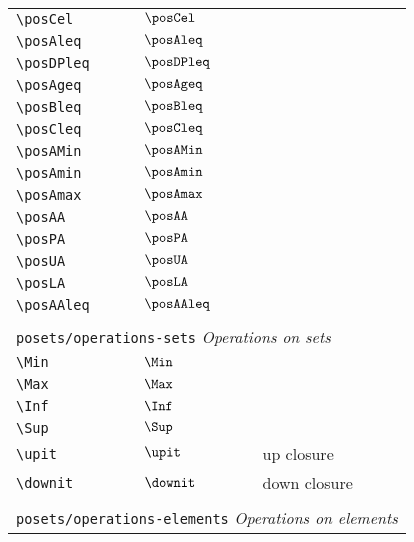 \begin{longtable}{lll}
 {\color[rgb]{0.5,0.5,0.5}\texttt{\textbackslash posCel}} & $\posCel$ & \\ 
 {\color[rgb]{0.5,0.5,0.5}\texttt{\textbackslash posAleq}} & $\posAleq$ & \\ 
 {\color[rgb]{0.5,0.5,0.5}\texttt{\textbackslash posDPleq}} & $\posDPleq$ & \\ 
 {\color[rgb]{0.5,0.5,0.5}\texttt{\textbackslash posAgeq}} & $\posAgeq$ & \\ 
 {\color[rgb]{0.5,0.5,0.5}\texttt{\textbackslash posBleq}} & $\posBleq$ & \\ 
 {\color[rgb]{0.5,0.5,0.5}\texttt{\textbackslash posCleq}} & $\posCleq$ & \\ 
 {\color[rgb]{0.5,0.5,0.5}\texttt{\textbackslash posAMin}} & $\posAMin$ & \\ 
 {\color[rgb]{0.5,0.5,0.5}\texttt{\textbackslash posAmin}} & $\posAmin$ & \\ 
 {\color[rgb]{0.5,0.5,0.5}\texttt{\textbackslash posAmax}} & $\posAmax$ & \\ 
 {\color[rgb]{0.5,0.5,0.5}\texttt{\textbackslash posAA}} & $\posAA$ & \\ 
 {\color[rgb]{0.5,0.5,0.5}\texttt{\textbackslash posPA}} & $\posPA$ & \\ 
 {\color[rgb]{0.5,0.5,0.5}\texttt{\textbackslash posUA}} & $\posUA$ & \\ 
 {\color[rgb]{0.5,0.5,0.5}\texttt{\textbackslash posLA}} & $\posLA$ & \\ 
 {\color[rgb]{0.5,0.5,0.5}\texttt{\textbackslash posAAleq}} & $\posAAleq$ & \\ 
  &  & \\ 
 \multicolumn{3}{l}{{\color[rgb]{0.5,0.5,0.5}\texttt{posets/operations-sets}} \emph{Operations on sets}}\\ 
 \hline
{\color[rgb]{0.5,0.5,0.5}\texttt{\textbackslash Min}} & $\Min$ & \\ 
 {\color[rgb]{0.5,0.5,0.5}\texttt{\textbackslash Max}} & $\Max$ & \\ 
 {\color[rgb]{0.5,0.5,0.5}\texttt{\textbackslash Inf}} & $\Inf$ & \\ 
 {\color[rgb]{0.5,0.5,0.5}\texttt{\textbackslash Sup}} & $\Sup$ & \\ 
 {\color[rgb]{0.5,0.5,0.5}\texttt{\textbackslash upit}} & $\upit$ &  up closure\\ 
 {\color[rgb]{0.5,0.5,0.5}\texttt{\textbackslash downit}} & $\downit$ &  down closure\\ 
  &  & \\ 
 \multicolumn{3}{l}{{\color[rgb]{0.5,0.5,0.5}\texttt{posets/operations-elements}} \emph{Operations on elements}}\\ 

\end{longtable}
